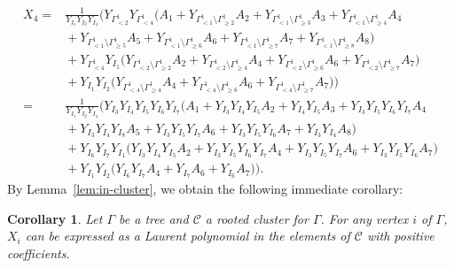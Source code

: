 \documentclass[10pt,a4paper]{amsart}
\numberwithin{equation}{section}
\newtheorem{Corollary}[Theorem]{Corollary}
\begin{document}
\begin{align*}
X_4={} & \frac{1}{Y_{I_1}Y_{I_2}Y_{I_4}}\big( Y_{\Gamma_{< 2}^1}Y_{\Gamma_{< 4}^1}\big(A_1+Y_{\Gamma_{< 1}^1\setminus\Gamma_{\geq 2}^1}A_2+Y_{\Gamma_{< 1}^1\setminus\Gamma_{\geq 3}^1}A_3+Y_{\Gamma_{< 1}^1\setminus\Gamma_{\geq 4}^1}A_4 \\
&{}+Y_{\Gamma_{< 1}^1\setminus\Gamma_{\geq 5}^1}A_5+Y_{\Gamma_{< 1}^1\setminus\Gamma_{\geq 6}^1}A_6+Y_{\Gamma_{< 1}^1\setminus\Gamma_{\geq 7}^1}A_7+Y_{\Gamma_{< 1}^1\setminus\Gamma_{\geq 8}^1}A_8\big) \\
&{}+ Y_{\Gamma_{< 4}^1}Y_{I_1}\big(Y_{\Gamma_{< 2}^1\setminus\Gamma_{\geq 2}^1}A_2+Y_{\Gamma_{< 2}^1\setminus\Gamma_{\geq 4}^1}A_4+Y_{\Gamma_{< 2}^1\setminus\Gamma_{\geq 6}^1}A_6+Y_{\Gamma_{< 2}^1\setminus\Gamma_{\geq 7}^1}A_7\big) \\
&{}+ Y_{I_1}Y_{I_2}\big(Y_{\Gamma_{< 4}^1\setminus\Gamma_{\geq 4}^1}A_4+Y_{\Gamma_{< 4}^1\setminus\Gamma_{\geq 6}^1}A_6+Y_{\Gamma_{< 4}^1\setminus\Gamma_{\geq 7}^1}A_7\big)\big)\\
={} & \frac{1}{Y_{I_1}Y_{I_2}Y_{I_4}}\big( Y_{I_3}Y_{I_4}Y_{I_5}Y_{I_6}Y_{I_7}\big(A_1+Y_{I_3}Y_{I_4}Y_{I_5}A_2+Y_{I_4}Y_{I_5}A_3+Y_{I_3}Y_{I_5}Y_{I_6}Y_{I_7}A_4 \\
&{}+ Y_{I_3}Y_{I_4}Y_{I_8}A_5+Y_{I_3}Y_{I_5}Y_{I_7}A_6+Y_{I_3}Y_{I_5}Y_{I_6}A_7+Y_{I_3}Y_{I_4}A_8\big)\\
&{} +Y_{I_6}Y_{I_7}Y_{I_1}\big(Y_{I_3}Y_{I_4}Y_{I_5}A_2 + Y_{I_3}Y_{I_5}Y_{I_6}Y_{I_7}A_4+Y_{I_3}Y_{I_5}Y_{I_7}A_6+Y_{I_3}Y_{I_5}Y_{I_6}A_7\big)\\
&{} +Y_{I_1}Y_{I_2}\big(Y_{I_6}Y_{I_7}A_4+Y_{I_7}A_6+Y_{I_6}A_7\big)\big).
\end{align*}
By Lemma~\ref{lem:in-cluster}, we obtain the following immediate corollary:
\begin{Corollary}\label{cor:X-pos}
Let $\Gamma$ be a tree and $\mathcal{C}$ a rooted cluster for $\Gamma$. For any vertex $i$ of $\Gamma$, $X_{i}$ can be expressed as a Laurent polynomial in the elements of $\mathcal{C}$ with positive coefficients.
\end{Corollary}
\end{document}
